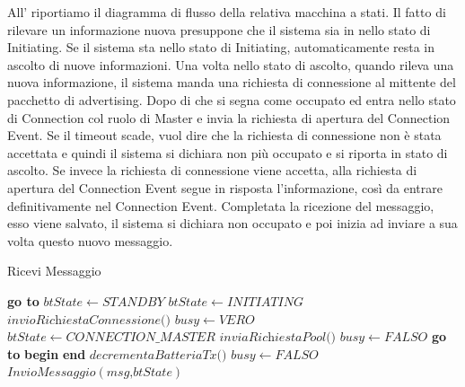 All' riportiamo il diagramma di flusso della relativa macchina a stati. Il fatto di rilevare un informazione nuova presuppone che il sistema sia in nello stato di Initiating. Se il sistema sta nello stato di Initiating, automaticamente resta in ascolto di nuove informazioni. Una volta nello stato di ascolto, quando rileva una nuova informazione, il sistema manda una richiesta di connessione al mittente del pacchetto di advertising. Dopo di che si segna come occupato ed entra nello stato di Connection col ruolo di Master e invia la richiesta di apertura del Connection Event. Se il timeout scade, vuol dire che la richiesta di connessione non è stata accettata e quindi il sistema si dichiara non più occupato e si riporta in stato di ascolto. Se invece la richiesta di connessione viene accetta, alla richiesta di apertura del Connection Event segue in risposta l'informazione, così da entrare definitivamente nel Connection Event. Completata la ricezione del messaggio, esso viene salvato, il sistema si dichiara non occupato e poi inizia ad inviare a sua volta questo nuovo messaggio.
\bigskip
\begin{algorithm}[t]
	\caption{Ricevi Messaggio}\label{alg:ricevi_msg}
	\begin{algorithmic}[1]
			\State \textbf{go to} 
		\EndIf
		\Label {}
		\State $\textit{btState} \gets STANDBY$
		\State $\textit{btState} \gets INITIATING$
		\Label {}
		\State $ \textit{invioRichiestaConnessione()}$
		\State $ \textit{busy} \gets VERO$
		\State $ \textit{btState} \gets CONNECTION\_MASTER $
		\State $ \textit{inviaRichiestaPool()}$
			\State $ \textit{busy} \gets FALSO$ 
			\State \textbf{go to} 
		\EndIf
		\State \textbf{begin}
			\State{}
		\State \textbf{end}
		\State $ \textit{decrementaBatteriaTx()} $
		\State $ \textit{busy} \gets FALSO$
		\State $ \textit{InvioMessaggio}\left(\textit{msg,btState}\right)  $
		\EndFunction
	\end{algorithmic}
\end{algorithm}
\bigskip

